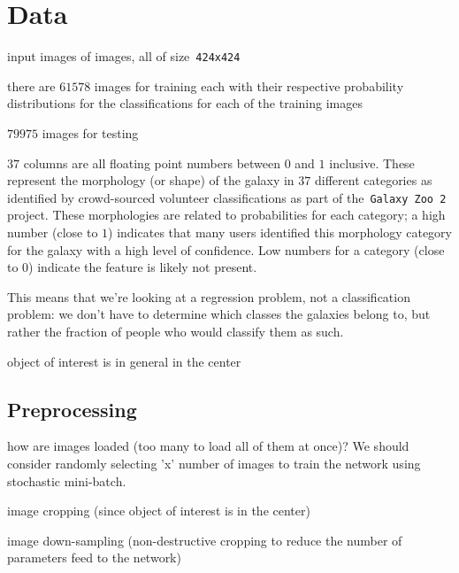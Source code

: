 \section{Data}

input images of images, all of size~\texttt{424x424}

there are $61578$ images for training each with their respective probability distributions for the classifications for each of the training images

$79975$ images for testing

$37$ columns are all floating point numbers between $0$ and $1$ inclusive. These represent the morphology (or shape) of the galaxy in $37$ different categories as identified by crowd-sourced volunteer classifications as part of the~\texttt{Galaxy Zoo 2} project. These morphologies are related to probabilities for each category; a high number (close to $1$) indicates that many users identified this morphology category for the galaxy with a high level of confidence. Low numbers for a category (close to $0$) indicate the feature is likely not present.

This means that we’re looking at a regression problem, not a classification problem: we don’t have to determine which classes the galaxies belong to, but rather the fraction of people who would classify them as such.

object of interest is in general in the center


\subsection{Preprocessing}

how are images loaded (too many to load all of them at once)? We should consider randomly selecting 'x' number of images to train the network using stochastic mini-batch.

image cropping (since object of interest is in the center)

image down-sampling (non-destructive cropping to reduce the number of parameters feed to the network)

